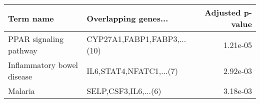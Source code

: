 \begin{tabular}{llr}
\toprule
                 Term name &        Overlapping genes... &  Adjusted p-value \\
\midrule
    PPAR signaling pathway & CYP27A1,FABP1,FABP3,...(10) &          1.21e-05 \\
Inflammatory bowel disease &     IL6,STAT4,NFATC1,...(7) &          2.92e-03 \\
                   Malaria &        SELP,CSF3,IL6,...(6) &          3.18e-03 \\
\bottomrule
\end{tabular}
